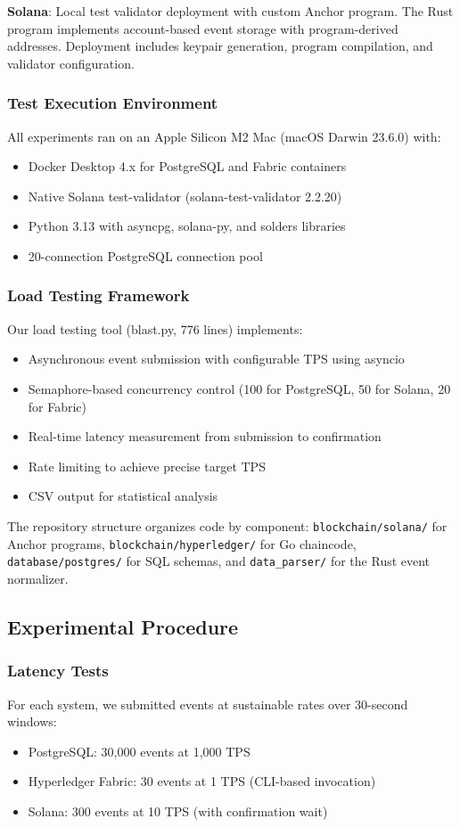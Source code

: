 \documentclass[conference]{IEEEtran}
\begin{document}
\textbf{Solana}: Local test validator deployment with custom Anchor program. The Rust program implements account-based event storage with program-derived addresses. Deployment includes keypair generation, program compilation, and validator configuration.

\subsubsection{Test Execution Environment}
All experiments ran on an Apple Silicon M2 Mac (macOS Darwin 23.6.0) with:
\begin{itemize}
\item Docker Desktop 4.x for PostgreSQL and Fabric containers
\item Native Solana test-validator (solana-test-validator 2.2.20)
\item Python 3.13 with asyncpg, solana-py, and solders libraries
\item 20-connection PostgreSQL connection pool
\end{itemize}

\subsubsection{Load Testing Framework}
Our load testing tool (blast.py, 776 lines) implements:
\begin{itemize}
\item Asynchronous event submission with configurable TPS using asyncio
\item Semaphore-based concurrency control (100 for PostgreSQL, 50 for Solana, 20 for Fabric)
\item Real-time latency measurement from submission to confirmation
\item Rate limiting to achieve precise target TPS
\item CSV output for statistical analysis
\end{itemize}

The repository structure organizes code by component: \texttt{blockchain/solana/} for Anchor programs, \texttt{blockchain/hyperledger/} for Go chaincode, \texttt{database/postgres/} for SQL schemas, and \texttt{data\_parser/} for the Rust event normalizer.

\subsection{Experimental Procedure}

\subsubsection{Latency Tests}
For each system, we submitted events at sustainable rates over 30-second windows:
\begin{itemize}
\item PostgreSQL: 30,000 events at 1,000 TPS
\item Hyperledger Fabric: 30 events at 1 TPS (CLI-based invocation)
\item Solana: 300 events at 10 TPS (with confirmation wait)
\end{itemize}
\end{document}
